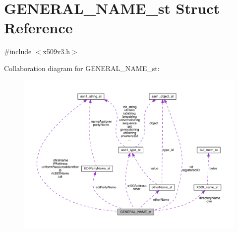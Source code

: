 \hypertarget{struct_g_e_n_e_r_a_l___n_a_m_e__st}{}\section{G\+E\+N\+E\+R\+A\+L\+\_\+\+N\+A\+M\+E\+\_\+st Struct Reference}
\label{struct_g_e_n_e_r_a_l___n_a_m_e__st}


{\ttfamily \#include $<$x509v3.\+h$>$}



Collaboration diagram for G\+E\+N\+E\+R\+A\+L\+\_\+\+N\+A\+M\+E\+\_\+st\+:\nopagebreak
\begin{figure}[H]
\begin{center}
\leavevmode
\includegraphics[width=350pt]{struct_g_e_n_e_r_a_l___n_a_m_e__st__coll__graph}
\end{center}
\end{figure}

